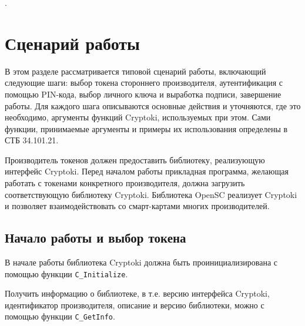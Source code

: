 


.

\section{Сценарий работы}

В этом разделе рассматривается типовой сценарий работы,
включающий следующие шаги: выбор токена стороннего
производителя, аутентификация с помощью PIN-кода, выбор
личного ключа и выработка подписи, завершение работы.
Для каждого шага описываются основные действия и
уточняются, где это необходимо, аргументы функций Cryptoki,
используемых при этом.
Сами функции, принимаемые аргументы и примеры
их использования определены в СТБ 34.101.21.

Производитель токенов должен предоставить библиотеку,
реализующую интерфейс Cryptoki. Перед началом работы прикладная
программа, желающая работать с токенами конкретного
производителя, должна загрузить соответствующую библиотеку
Cryptoki. Библиотека OpenSC реализует Cryptoki и позволяет
взаимодействовать со смарт-картами многих производителей.

\subsection{Начало работы и выбор токена}

В начале работы библиотека Cryptoki должна быть
проинициализирована с помощью функции \verb|C_Initialize|.

Получить информацию о библиотеке, в т.е. версию интерфейса
Cryptoki, идентификатор производителя, описание и версию
библиотеки, можно с помощью функции \verb|C_GetInfo|.

